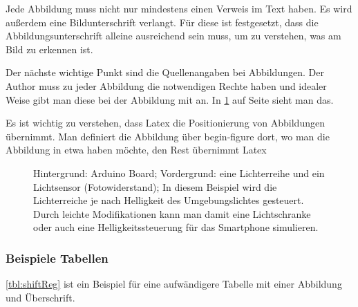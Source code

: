 Jede Abbildung muss nicht nur mindestens einen Verweis im Text haben. Es wird außerdem eine Bildunterschrift verlangt. Für diese ist festgesetzt, dass die Abbildungsunterschrift alleine ausreichend sein muss, um zu verstehen, was am Bild zu erkennen ist. 

Der nächste wichtige Punkt sind die Quellenangaben bei Abbildungen. Der Author muss zu jeder Abbildung die notwendigen Rechte haben und idealer Weise gibt man diese bei der Abbildung mit an. In \cref{fig:ArduExample} auf Seite \pageref{fig:ArduExample} sieht man das.

Es ist wichtig zu verstehen, dass Latex die Positionierung von Abbildungen übernimmt. Man definiert die Abbildung über begin-figure dort, wo man die Abbildung in etwa haben  möchte, den Rest übernimmt Latex

\begin{figure}[t]
\centering
\caption[Arduino mit Lichtsensor und Lichterkette]{Hintergrund: Arduino Board;
Vordergrund: eine Lichterreihe und ein Lichtsensor (Fotowiderstand); In diesem
Beispiel wird die Lichterreiche je nach Helligkeit des Umgebungslichtes
gesteuert. Durch leichte Modifikationen kann man damit eine Lichtschranke oder
auch eine Helligkeitssteuerung für das Smartphone simulieren.}
\label{fig:ArduExample}
\end{figure}

\subsubsection{Beispiele Tabellen}

\cref{tbl:shiftReg} ist ein Beispiel für eine aufwändigere Tabelle mit einer
Abbildung und Überschrift.

